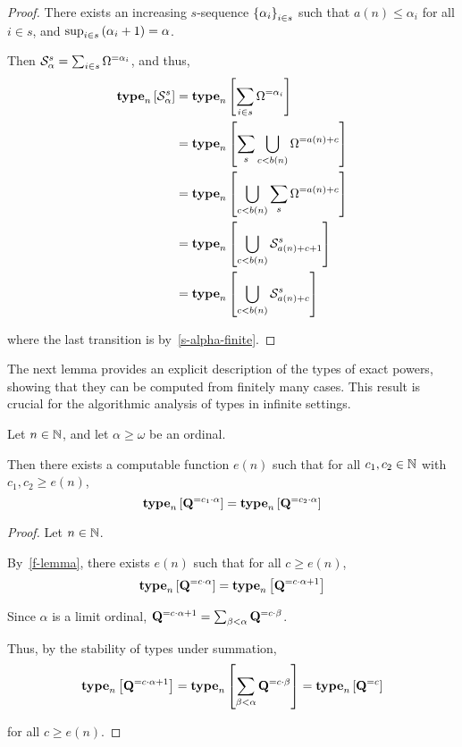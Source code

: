 \begin{proof}
    There exists an increasing $s$-sequence $\left\{ {\alpha_i} \right\}_{i \in s}$ such that
    $a(n) \le \alpha_i$ for all $i \in s$,
    and $\sup_{i \in s} \left( {\alpha_i + 1} \right) = \alpha$.

    Then $\mathcal{S}^{s}_{\alpha} = \sum_{i \in s} \Omega^{= \alpha_i}$,
    and thus,
    \begin{align*}
        \mathbf{type}_{n} \left[ {\mathcal{S}^{s}_{\alpha}} \right]
         & = \mathbf{type}_{n} \left[ {\sum_{i \in s} \Omega^{= \alpha_i}} \right]                   \\
         & = \mathbf{type}_{n} \left[ {\sum_{s} \bigcup_{c < b(n)}{\Omega^{= a(n) + c}}} \right]     \\
         & = \mathbf{type}_{n} \left[ {\bigcup_{c < b(n)}{\sum_{s} \Omega^{= a(n) + c}}} \right]     \\
         & = \mathbf{type}_{n} \left[ {\bigcup_{c < b(n)}{\mathcal{S}^{s}_{a(n) + c + 1}}} \right] \\
         & = \mathbf{type}_{n} \left[ {\bigcup_{c < b(n)}{\mathcal{S}^{s}_{a(n) + c}}} \right]     \\
    \end{align*}

    where the last transition is by~\cref{s-alpha-finite}.

\end{proof}

The next lemma provides an explicit description of the types of exact powers, showing that they can be computed from
finitely many cases. This result is crucial for the algorithmic analysis of types in infinite settings.

\begin{lemma}
    Let $n \in \mathbb{N}$, and let $\alpha \ge \omega$ be an ordinal.

    Then there exists a computable function $e(n)$ such that
    for all $c_1, c_2 \in \mathbb{N}$ with $c_1, c_2 \ge e(n)$,
    \[\mathbf{type}_{n} \left[ {\mathbf{Q}^{= c_1 \cdot \alpha}} \right] = \mathbf{type}_{n} \left[ {\mathbf{Q}^{= c_2 \cdot \alpha}} \right]\]
\end{lemma}

\begin{proof}
    Let $n \in \mathbb{N}$.

    By~\cref{f-lemma}, there exists $e(n)$ such that
    for all $c \ge e(n)$,
    \[\mathbf{type}_{n} \left[ {\mathbf{Q}^{= c \cdot \alpha}} \right] = \mathbf{type}_{n} \left[ {\mathbf{Q}^{= c \cdot \alpha + 1}} \right]\]

    Since $\alpha$ is a limit ordinal,
    $\mathbf{Q}^{= c \cdot \alpha + 1} = \sum_{\beta < \alpha}{\mathbf{Q}^{= c \cdot \beta}}$.

    Thus, by the stability of types under summation,
    \[\mathbf{type}_{n} \left[ {\mathbf{Q}^{= c \cdot \alpha + 1}} \right] = \mathbf{type}_{n} \left[ {\sum_{\beta < \alpha}{\mathbf{Q}^{= c \cdot \beta}}} \right] = \mathbf{type}_{n} \left[ {\mathbf{Q}^{= c}} \right]\]

    for all $c \ge e(n)$.
\end{proof}


